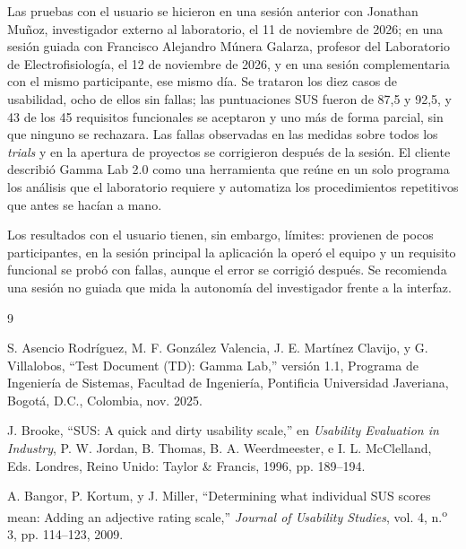 \documentclass[12pt,letterpaper,oneside]{article}
\DeclareRobustCommand{\_}{\textunderscore\allowbreak}
\newcommand{\fechasesion}{12 de noviembre de 2026}
\newcommand{\fechasesionanterior}{11 de noviembre de 2026}
\begin{document}
Las pruebas con el usuario se hicieron en una sesión anterior con Jonathan Muñoz, investigador externo al laboratorio, el \fechasesionanterior{}; en una sesión guiada con Francisco Alejandro Múnera Galarza, profesor del Laboratorio de Electrofisiología, el \fechasesion{}, y en una sesión complementaria con el mismo participante, ese mismo día. Se trataron los diez casos de usabilidad, ocho de ellos sin fallas; las puntuaciones SUS fueron de 87,5 y 92,5, y 43 de los 45 requisitos funcionales se aceptaron y uno más de forma parcial, sin que ninguno se rechazara. Las fallas observadas en las medidas sobre todos los \textit{trials} y en la apertura de proyectos se corrigieron después de la sesión. El cliente describió Gamma Lab 2.0 como una herramienta que reúne en un solo programa los análisis que el laboratorio requiere y automatiza los procedimientos repetitivos que antes se hacían a mano.

Los resultados con el usuario tienen, sin embargo, límites: provienen de pocos participantes, en la sesión principal la aplicación la operó el equipo y un requisito funcional se probó con fallas, aunque el error se corrigió después. Se recomienda una sesión no guiada que mida la autonomía del investigador frente a la interfaz.

\begin{thebibliography}{9}

S. Asencio Rodríguez, M. F. González Valencia, J. E. Martínez Clavijo, y G. Villalobos, ``Test Document (TD): Gamma Lab,'' versión 1.1, Programa de Ingeniería de Sistemas, Facultad de Ingeniería, Pontificia Universidad Javeriana, Bogotá, D.C., Colombia, nov. 2025.

J. Brooke, ``SUS: A quick and dirty usability scale,'' en \textit{Usability Evaluation in Industry}, P. W. Jordan, B. Thomas, B. A. Weerdmeester, e I. L. McClelland, Eds. Londres, Reino Unido: Taylor \& Francis, 1996, pp. 189--194.

A. Bangor, P. Kortum, y J. Miller, ``Determining what individual SUS scores mean: Adding an adjective rating scale,'' \textit{Journal of Usability Studies}, vol. 4, n.\textsuperscript{o} 3, pp. 114--123, 2009.

\end{thebibliography}
\end{document}
